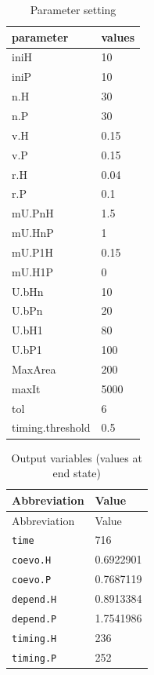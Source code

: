 \documentclass[]{book}
\begin{document}
\begin{table}[!h]

\caption{\label{tab:1runcoevocoetaparspdf}Parameter setting}
\centering
\begin{tabular}{l|l}
\hline
parameter & values\\
\hline
iniH & 10\\
\hline
iniP & 10\\
\hline
n.H & 30\\
\hline
n.P & 30\\
\hline
v.H & 0.15\\
\hline
v.P & 0.15\\
\hline
r.H & 0.04\\
\hline
r.P & 0.1\\
\hline
mU.PnH & 1.5\\
\hline
mU.HnP & 1\\
\hline
mU.P1H & 0.15\\
\hline
mU.H1P & 0\\
\hline
U.bHn & 10\\
\hline
U.bPn & 20\\
\hline
U.bH1 & 80\\
\hline
U.bP1 & 100\\
\hline
MaxArea & 200\\
\hline
maxIt & 5000\\
\hline
tol & 6\\
\hline
timing.threshold & 0.5\\
\hline
\end{tabular}
\end{table}

\vspace{1cm}

\begin{longtable}[]{@{}ll@{}}
\caption{Output variables (values at end state)}\tabularnewline
\toprule
Abbreviation & Value\tabularnewline
\midrule
\endfirsthead
\toprule
Abbreviation & Value\tabularnewline
\midrule
\endhead
\texttt{time} & 716\tabularnewline
\texttt{coevo.H} & 0.6922901\tabularnewline
\texttt{coevo.P} & 0.7687119\tabularnewline
\texttt{depend.H} & 0.8913384\tabularnewline
\texttt{depend.P} & 1.7541986\tabularnewline
\texttt{timing.H} & 236\tabularnewline
\texttt{timing.P} & 252\tabularnewline
\bottomrule
\end{longtable}

\newpage
\end{document}
